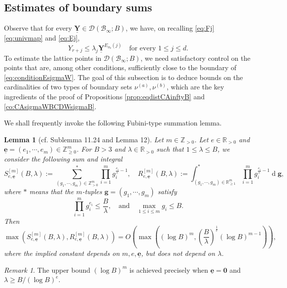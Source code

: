 \documentclass[11pt,letterpaper]{amsart}
\newcommand{\BR}{{\mathbb {R}}}
\newcommand{\BZ}{{\mathbb {Z}}}
\newcommand{\CB}{{\mathcal {B}}}
\newcommand{\CD}{{\mathcal {D}}}
\newcommand{\YY}{\underline{\mathbf{Y}}}
\newcommand{\ee}{\underline{\mathbf{e}}}
\theoremstyle{plain}
\numberwithin{equation}{section}
\newtheorem{lemma}[theorem]{Lemma}
\theoremstyle{definition}
\theoremstyle{remark}
\newtheorem{remark}[theorem]{Remark}
\begin{document}
\subsection{Estimates of boundary sums}
Observe that for every $\YY\in \CD(\CB_\infty;B)$, we have, on recalling \eqref{eq:Fj} \eqref{eq:univmap} and \eqref{eq:Ej},
\begin{equation}\label{eq:conditionEsigmaW}	
	Y_{r+j}\leqslant \lambda_j \YY^{E_{\sigma_0}(j)} \quad \text{for every }1\leqslant j\leqslant d. \end{equation} 
To estimate the lattice points in $\CD(\CB_\infty;B)$, we need satisfactory control on the points that are, among other conditions, sufficiently close to the boundary of \eqref{eq:conditionEsigmaW}. The goal of this subsection is to deduce bounds on the cardinalities of two types of boundary sets $\nu^{(a)},\nu^{(b)}$, which are the key ingredients of the proof of Propositions \ref{prop:eqdistCAinftyB} and \ref{co:CAsigmaWBCDWsigmaB}.

We shall frequently invoke the following Fubini-type summation lemma.
\begin{lemma}[cf. \cite{Salberger} Sublemma 11.24 and \cite{Pieropan} Lemma 12]\label{le:sublemma}
	Let $m\in\BZ_{>0}$. Let $e\in\BR_{>0}$ and $\ee=(e_1,\cdots,e_m)\in\BZ_{\geqslant 0}^m$. For $B>3$ and $\lambda\in\BR_{>0}$ such that $1\leqslant \lambda \leqslant B$, we consider the following  sum and integral 
	$$S_{e,\ee}^{[m]}(B,\lambda):=\sum_{(g_1,\cdots,g_m)\in\BZ_{>0}^m}^{*}\prod_{i=1}^{m}g_i^{\frac{e_i}{e}-1},\quad R_{e,\ee}^{[m]}(B,\lambda):=\int_{(g_1,\cdots,g_m)\in\BR_{\geqslant 1}^m}^{*}\prod_{i=1}^{m}g_i^{\frac{e_i}{e}-1}\operatorname{d}\mathbf{g},$$ where $*$ means that the $m$-tuples $\mathbf{g}=(g_1,\cdots,g_m)$ satisfy
	\begin{equation}\label{eq:condition2}
		\prod_{i=1}^m g_i^{e_i}\leqslant \frac{B}{\lambda},\quad \text{and}\quad \max_{1\leqslant i\leqslant m}g_i\leqslant B.
	\end{equation} Then
	$$\max\left(S_{e,\ee}^{[m]}(B,\lambda),R_{e,\ee}^{[m]}(B,\lambda)\right)=O\left(\max\left((\log B)^m,\left(\frac{B}{\lambda}\right)^{\frac{1}{e}}(\log B)^{m-1}\right)\right),$$ where the implied constant depends on $m,e,\ee$, but does not depend on $\lambda$.
\end{lemma}
\begin{remark}\label{rmk:sublemma}
	The upper bound $(\log B)^m$ is achieved precisely when $\ee=\mathbf{0}$ and $\lambda\geqslant B/(\log B)^e$.
\end{remark}
 
\end{document}
